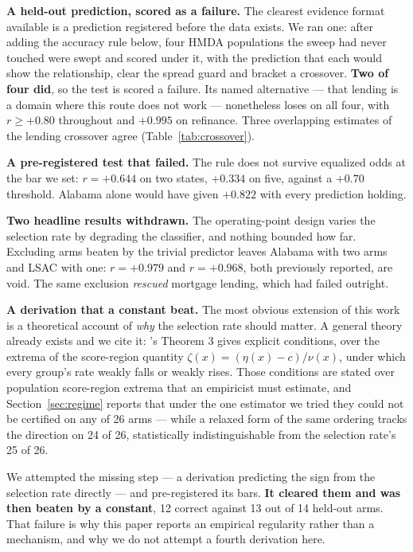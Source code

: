 \documentclass[9pt,conference]{IEEEtran}
\begin{document}
\textbf{A held-out prediction, scored as a failure.} The clearest evidence format available is
a prediction registered before the data exists. We ran one: after adding the accuracy rule
below, four HMDA populations the sweep had never touched were swept and scored under it, with
the prediction that each would show the relationship, clear the spread guard and bracket a
crossover. \textbf{Two of four did}, so the test is scored a failure. Its named alternative ---
that lending is a domain where this route does not work --- nonetheless loses on all four, with
$r \geq +0.80$ throughout and $+0.995$ on refinance. Three overlapping estimates of the lending
crossover agree (Table~\ref{tab:crossover}).

\textbf{A pre-registered test that failed.} The rule does not survive equalized odds at the bar
we set: $r = +0.644$ on two states, $+0.334$ on five, against a $+0.70$ threshold. Alabama
alone would have given $+0.822$ with every prediction holding.

\textbf{Two headline results withdrawn.} The operating-point design varies the selection rate by
degrading the classifier, and nothing bounded how far. Excluding arms beaten by the trivial
predictor leaves Alabama with two arms and LSAC with one: $r = +0.979$ and $r = +0.968$, both
previously reported, are void. The same exclusion \emph{rescued} mortgage lending, which had
failed outright.

\textbf{A derivation that a constant beat.} The most obvious extension of this work is a
theoretical account of \emph{why} the selection rate should matter. A general theory already
exists and we cite it: \cite{backfire2026}'s Theorem 3 gives explicit conditions, over the
extrema of the score-region quantity $\zeta(x) = (\eta(x)-c)/\nu(x)$, under which every group's
rate weakly falls or weakly rises. Those conditions are stated over population score-region
extrema that an empiricist must estimate, and Section~\ref{sec:regime} reports that under
the one estimator we tried they could not be certified on any of 26 arms --- while a
relaxed form of the same ordering tracks the direction on 24 of 26, statistically
indistinguishable from the selection rate's 25 of 26.

We attempted the missing step --- a derivation predicting the sign from the selection rate
directly --- and pre-registered its bars. \textbf{It cleared them and was then beaten by a
constant}, 12 correct against 13 out of 14 held-out arms. That failure is why this paper reports
an empirical regularity rather than a mechanism, and why we do not attempt a fourth derivation
here.
\end{document}
